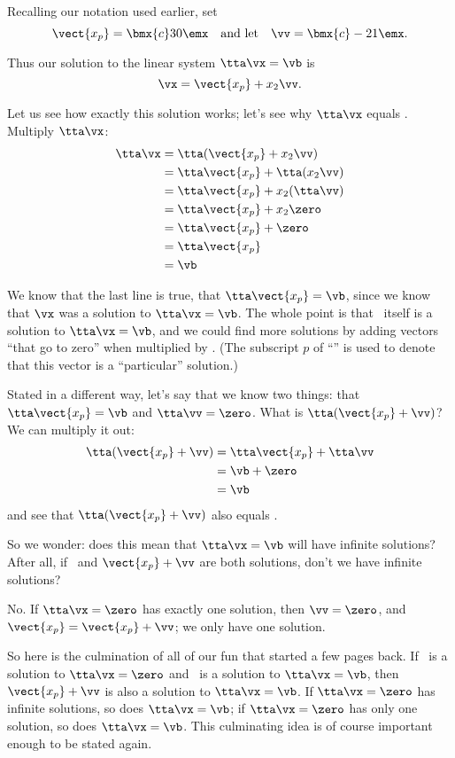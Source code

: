 Recalling our notation used earlier, set 
\[
\vect{x_p} = \bmx{c} 3\\0\emx \quad \text{and let} \quad  \vv = \bmx{c}-2\\1\emx.
\]

Thus our solution to the linear system $\tta\vx = \vb$ is 
\[
\vx = \vect{x_p} + x_2\vv.
\]

Let us see how exactly this solution works; let's see why $\tta\vx$ equals \vb.  Multiply $\tta\vx$: 
\begin{align*}
 \tta\vx &=\tta(\vect{x_p}+x_2\vv) \\
  &= \tta\vect{x_p} + \tta(x_2\vv)\\
  &= \tta\vect{x_p} + x_2(\tta\vv) \\
  &= \tta\vect{x_p} + x_2\zero \\ 
  &= \tta\vect{x_p} + \zero \\ 
  &= \tta\vect{x_p}\\ 
  &=\vb 
\end{align*}

We know that the last line is true, that $\tta\vect{x_p} = \vb$, since we know that $\vx$ was a solution to $\tta\vx = \vb$. The whole point is that \ itself is a solution to $\tta\vx = \vb$, and we could find more solutions by adding vectors ``that go to zero'' when multiplied by \tta. (The subscript $p$ of ``'' is used to denote that this vector is a ``particular'' solution.)

Stated in a different way, let's say that we know two things: that $\tta\vect{x_p} = \vb$ and $\tta\vv = \zero$. What is $\tta(\vect{x_p}+\vv)$? We can multiply it out: 
\begin{align*}
 \tta(\vect{x_p}+\vv) &= \tta\vect{x_p} + \tta\vv \\&= \vb + \zero \\
  &= \vb
\end{align*} 
and see that $\tta(\vect{x_p}+\vv)$ also equals \vb.

So we wonder: does this mean that $\tta\vx = \vb$ will have infinite solutions? After all, if \ and $\vect{x_p}+\vv$ are both solutions, don't we have infinite solutions?

No. If $\tta\vx = \zero$ has exactly one solution, then $\vv = \zero$, and $\vect{x_p} = \vect{x_p} +\vv$; we only have one solution.

So here is the culmination of all of our fun that started a few pages back. %
 If \vv\ is a solution to $\tta\vx=\zero$ and \ is a solution to $\tta\vx=\vb$, then $\vect{x_p}+\vv$ is also a solution to $\tta\vx=\vb$. If $\tta\vx=\zero$ has infinite solutions, so does $\tta\vx = \vb$; if $\tta\vx=\zero$ has only one solution, so does $\tta\vx = \vb$. This culminating idea is of course important enough to be stated again.

